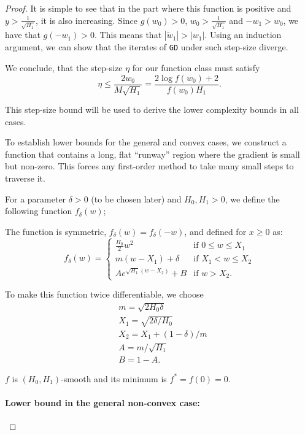 \documentclass[a4paper,11pt]{article}
\newcommand{\algname}[1]{\texttt{#1}}
\newcommand{\1}{\mathbbm{1}}
\theoremstyle{plain}
\begin{document}
\begin{proof}
It is simple to see that in the part where this function is positive and $y>\frac{1}{\sqrt{H_1}}$, it is also increasing. Since $g(w_0)>0$, $w_0>\frac{1}{\sqrt{H_1}}$ and $-w_1>w_0$, we have that $g(-w_1)>0$. This means that $|\tilde w_1|>|w_1|$. Using an induction argument, we can show that the iterates of \algname{GD} under such step-size diverge.

We conclude, that the step-size $\eta$ for our function class must satisfy
\begin{equation}
\label{eq:eta_upper_bound}
    \eta \leq \frac{2w_0}{M \sqrt{H_1}} =  \frac{2 \log f(w_0)+2}{f(w_0) H_1}.
\end{equation}

This step-size bound will be used to derive the lower complexity bounds in all cases.


To establish lower bounds for the general and convex cases, we construct a function that contains a long, flat ``runway'' region where the gradient is small but non-zero. This forces any first-order method to take many small steps to traverse it.

For a parameter $\delta>0$ (to be chosen later) and $H_0, H_1>0$, we define the following function $f_\delta(w)$;

The function is symmetric, $f_\delta(w) = f_\delta(-w)$, and defined for $x \geq 0$ as:
\begin{equation}
\label{func:non- convex_convex_lower_bound}
f_\delta(w) = 
\begin{cases} 
\frac{H_0}{2}w^2 & \text{if } 0 \leq w \leq X_1 \\
m(w - X_1) + \delta & \text{if } X_1 < w \leq X_2 \\
A e^{\sqrt{H_1}(w-X_2)} + B & \text{if } w > X_2. 
\end{cases}
\end{equation}

To make this function twice differentiable, we choose
\begin{align*}
&m = \sqrt{2 H_0 \delta}\\
&X_1 = \sqrt{2\delta / H_0}\\
&X_2 = X_1 + (1 - \delta)/m\\
&A = m / \sqrt{H_1}\\
&B = 1 - A.
\end{align*}

$f$ is $(H_0,H_1)$-smooth and its minimum is $f^* = f(0) = 0$.

\paragraph{Lower bound in the general non-convex case:}



\end{proof}
\end{document}
